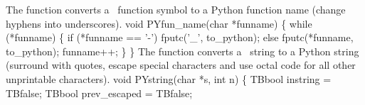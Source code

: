 The  function converts a \TB\ function symbol to a
Python function name (change hyphens into underscores).
\nwenddocs{}\plusendmoddef\nwstartdeflinemarkup{}\nwenddeflinemarkup
void PYfun_name(char *funname) \{
  while (*funname) \{
    if (*funname == '-') fputc('_', to_python);
    else                 fputc(*funname, to_python);
    funname++;
  \}
\}
\nwendcode{}\nwdocspar
The  function converts a \TB\ string to a Python
string (surround with quotes, escape special characters and use
octal code for all other unprintable characters).
\nwenddocs{}\plusendmoddef\nwstartdeflinemarkup{}\nwenddeflinemarkup
void PYstring(char *s, int n) \{
  TBbool instring = TBfalse;
  TBbool prev_escaped = TBfalse;

